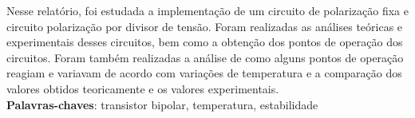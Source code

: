 \setlength{\absparsep}{18pt} %
 \begin{resumo}
Nesse relatório, foi estudada a implementação de um circuito de polarização fixa e circuito polarização  por divisor de tensão. Foram realizadas as análises teóricas e experimentais desses circuitos, bem como a obtenção dos pontos de operação dos circuitos. Foram também realizadas a análise de como alguns pontos de operação reagiam e variavam de acordo com variações de temperatura e a comparação dos valores obtidos teoricamente e os valores experimentais.
\\
 \noindent
 \textbf{Palavras-chaves}: transistor bipolar, temperatura, estabilidade
\end{resumo} 